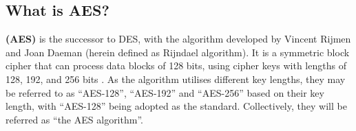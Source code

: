 \subsection{What is AES?}

\textbf{ (\gls{AES})} is the successor to \gls{DES}, with the algorithm developed by Vincent Rijmen and Joan Daeman (herein defined as Rijndael algorithm). 
It is a symmetric block cipher that can process data blocks of 128 bits, using cipher keys with lengths of 128, 192, and 256 bits \cite{NIST_AES}.
As the algorithm utilises different key lengths, they may be referred to as ``\gls{AES}-128'', ``\gls{AES}-192'' and ``\gls{AES}-256'' based on their key length, with ``\gls{AES}-128'' being adopted as the standard. 
Collectively, they will be referred as ``the \gls{AES} algorithm''.

